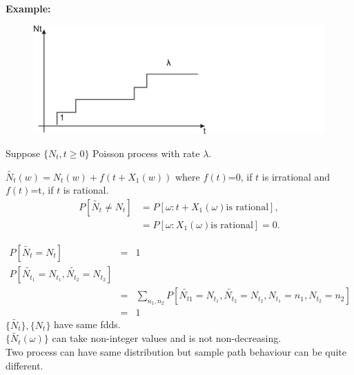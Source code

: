 \documentclass[11 pt]{article}
\theoremstyle{plain}
\theoremstyle{definition}
\theoremstyle{remark}
\begin{document}
   \textbf{Example:}\\
\begin{figure}[h!]
\center
  \includegraphics[width=4.5in]{rate.PNG}\\
\end{figure}
Suppose $\{N_{t}, t \geq 0\}$ Poisson process with rate $\lambda$. 

$\tilde{N_{t}}(w)= N_{t}(w)+f(t+X_{1}(w))$ where $f(t)$=0, if $t$ is irrational and $f(t)$=t, if $t$ is rational.\\
\begin{eqnarray*}
  P[\tilde{N_{t}}\neq N_{t}] &= P[\omega:t+X_{1}(\omega) \text{is rational}],\\
  &= P[\omega:X_1(\omega)  \text{is rational} ] =0.
\end{eqnarray*}
 
\begin{eqnarray*}
  P[\tilde{N_{t}}= N_{t}] &=& 1\\
  P[\tilde{N_{t_1}}= N_{t_1},\tilde{N_{t_2}}= N_{t_2} ] \\
  &=& \sum_{n_{1},n_{2}}P[\tilde{N_{t1}}= N_{t_1},\tilde{N_{t_2}}= N_{t_2}, N_{t_1}=n_1, N_{t_2}=n_2 ] \\
   &=& 1
\end{eqnarray*}
$\{\tilde{N_{t}}\}, \{N_{t}\}$ have same fdds.\\
$\{\tilde{N_{t}}(\omega)\}$ can take non-integer values and is not non-decreasing.\\
Two process can have same distribution but sample path behaviour can be quite different.\\
\end{document}
